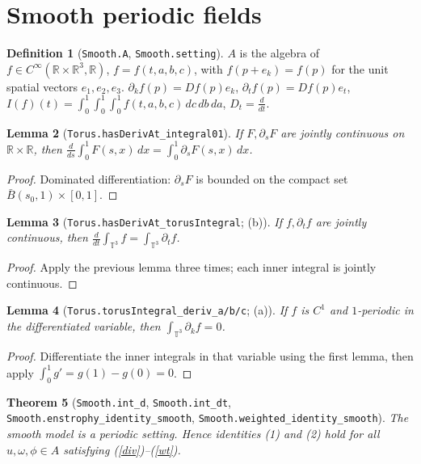 \documentclass[11pt]{article}
\newtheorem{theorem}{Theorem}\newtheorem{lemma}[theorem]{Lemma}\theoremstyle{definition}\newtheorem{definition}[theorem]{Definition}
\begin{document}
\section{Smooth periodic fields}\label{smooth}
\begin{definition}[\texttt{Smooth.A}, \texttt{Smooth.setting}]
$A$ is the algebra of $f\in C^\infty(\mathbb{R}\times\mathbb{R}^3,\mathbb{R})$, $f=f(t,a,b,c)$, with
$f(p+e_k)=f(p)$ for the unit spatial vectors $e_1,e_2,e_3$. $\partial_k f(p)=Df(p)e_k$,
$\partial_tf(p)=Df(p)e_t$, $I(f)(t)=\int_0^1\!\int_0^1\!\int_0^1 f(t,a,b,c)\,dc\,db\,da$, $D_t=\frac{d}{dt}$.
\end{definition}
\begin{lemma}[\texttt{Torus.hasDerivAt\_integral01}]
If $F,\partial_sF$ are jointly continuous on $\mathbb{R}\times\mathbb{R}$, then
$\frac{d}{ds}\int_0^1F(s,x)\,dx=\int_0^1\partial_sF(s,x)\,dx$.
\end{lemma}
\begin{proof}Dominated differentiation: $\partial_sF$ is bounded on the compact set
$\bar B(s_0,1)\times[0,1]$.\end{proof}
\begin{lemma}[\texttt{Torus.hasDerivAt\_torusIntegral}; (b)]
If $f,\partial_tf$ are jointly continuous, then $\frac{d}{dt}\int_{\mathbb{T}^3}f=\int_{\mathbb{T}^3}\partial_tf$.
\end{lemma}
\begin{proof}Apply the previous lemma three times; each inner integral is jointly continuous.\end{proof}
\begin{lemma}[\texttt{Torus.torusIntegral\_deriv\_a/b/c}; (a)]
If $f$ is $C^1$ and $1$-periodic in the differentiated variable, then $\int_{\mathbb{T}^3}\partial_kf=0$.
\end{lemma}
\begin{proof}Differentiate the inner integrals in that variable using the first lemma, then apply
$\int_0^1g'=g(1)-g(0)=0$.\end{proof}
\begin{theorem}[\texttt{Smooth.int\_d}, \texttt{Smooth.int\_dt}, \texttt{Smooth.enstrophy\_identity\_smooth}, \texttt{Smooth.weighted\_identity\_smooth}]
The smooth model is a periodic setting. Hence identities (1) and (2) hold for all
$u,\omega,\phi\in A$ satisfying (\ref{div})--(\ref{wt}).
\end{theorem}
\end{document}
